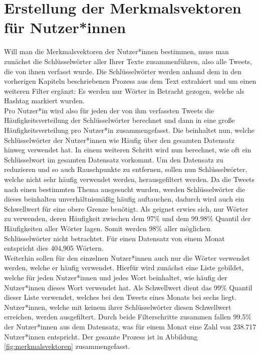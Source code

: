 \section{Erstellung der Merkmalsvektoren für Nutzer*innen}
\label{sec:merkmalsvektoren}
Will man die Merkmalsvektoren der Nutzer*innen bestimmen, muss man zunächst die Schlüsselwörter aller Ihrer Texte zusammenführen, also alle Tweets, die von ihnen verfasst wurde. Die Schlüsselwörter werden anhand dem in den vorherigen Kapiteln beschriebenen Prozess aus dem Text extrahiert und um einen weiteren Filter ergänzt: Es werden nur Wörter in Betracht gezogen, welche als Hashtag markiert wurden. \\ \newline
Pro Nutzer*in wird also für jeden der von ihm verfassten Tweets die Häufigkeitsverteilung der Schlüsselwörter berechnet und dann in eine große Häufigkeitsverteilung pro Nutzer*in zusammengefasst. Die beinhaltet nun, welche Schlüsselwörter der Nutzer*innen wie Häufig über den gesamten Datensatz hinweg verwendet hat. In einem weiteren Schritt wird nun berechnet, wie oft ein Schlüsselwort im gesamten Datensatz vorkommt. Um den Datensatz zu reduzieren und so auch Rauschpunkte zu entfernen, sollen nun Schlüsselwörter, welche nicht sehr häufig verwendet werden, herausgefiltert werden. Da die Tweets nach einen bestimmten Thema ausgesucht wurden, werden Schlüsselwörter die dieses beinhalten unverhältnismäßig häufig auftauchen, dadurch wird auch ein Schwellwert für eine obere Grenze benötigt. Als geignet erwies sich, nur Wörter zu verwenden, deren Häufigkeit zwischen dem 97\% und dem 99.98\% Quantil der Häufigkeiten aller Wörter lagen. Somit werden 98\% aller möglichen Schlüsselwörter nicht betrachtet. Für einen Datensatz von einem Monat entspricht dies 404,905 Wörtern. \\ \newline
Weiterhin sollen für den einzelnen Nutzer*innen auch nur die Wörter verwendet werden, welche er häufig verwendet. Hierfür wird zunächst eine Liste gebildet, welche  für jeden Nutzer*innen und jedes Wort beinhaltet, wie häufig der Nutzer*innen dieses Wort verwendet hat. Als Schwellwert dient das 99\% Quantil dieser Liste verwendet, welches bei den Tweets eines Monats bei sechs liegt. Nutzer*innen, welche mit keinem ihrer Schlüsselwörter diesen Schwellwert erreichen, werden ausgefiltert. Durch beide Filterschritte zusammen fallen 99.5\% der Nutzer*innen aus dem Datensatz, was für einem Monat eine Zahl von 238.717 Nutzer*innen entspricht. Der gesamte Prozess ist in Abbildung \ref{fig:merkmalsvektoren} zusammengefasst.
